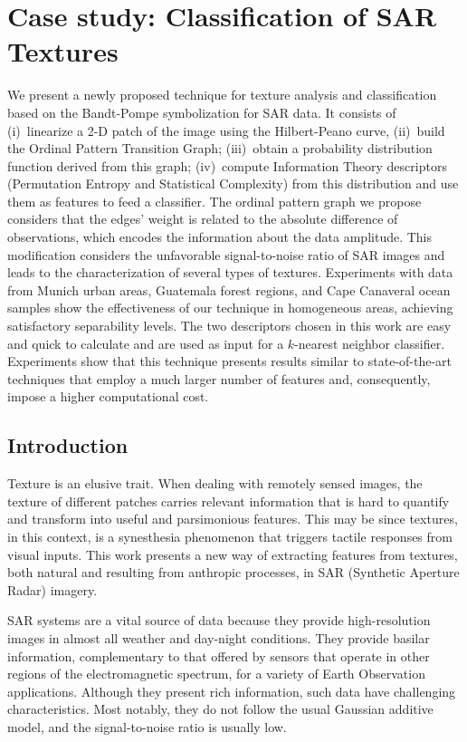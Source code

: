 \chapter{Case study: Classification of SAR Textures}\label{chapter:SARclassification}

We present a newly proposed technique for texture analysis and classification based on the Bandt-Pompe symbolization for SAR data.
It consists of
(i)~linearize a \mbox{2-D} patch of the image using the Hilbert-Peano curve,
(ii)~build the Ordinal Pattern Transition Graph;
(iii)~obtain a probability distribution function derived from this graph;
(iv)~compute Information Theory descriptors (Permutation Entropy and Statistical Complexity) from this distribution and use them as features to feed a classifier.
The ordinal pattern graph we propose considers that the edges' weight is related to the absolute difference of observations, which encodes the information about the data amplitude. 
This modification considers the unfavorable signal-to-noise ratio of SAR images and leads to the characterization of several types of textures.
Experiments with data from Munich urban areas, Guatemala forest regions, and Cape Canaveral ocean samples show the effectiveness of our technique in homogeneous areas, achieving satisfactory separability levels.
The two descriptors chosen in this work are easy and quick to calculate and are used as input for a $k$-nearest neighbor classifier.
Experiments show that this technique presents results similar to state-of-the-art techniques that employ a much larger number of features and, consequently, impose a higher computational cost.

\section{Introduction}\label{SAR:Intro}

Texture is an elusive trait.
When dealing with remotely sensed images, the texture of different patches carries relevant information that is hard to quantify and transform into useful and parsimonious features.
This may be since textures, in this context, is a synesthesia phenomenon that triggers tactile responses from visual inputs.
This work presents a new way of extracting features from textures, both natural and resulting from anthropic processes, in SAR (Synthetic Aperture Radar) imagery.

SAR systems are a vital source of data because they provide high-resolution images in almost all weather and day-night conditions.
They provide basilar information, complementary to that offered by sensors that operate in other regions of the electromagnetic spectrum, for a variety of Earth Observation applications.	
Although they present rich information, such data have challenging characteristics.
Most notably, they do not follow the usual Gaussian additive model, and the signal-to-noise ratio is usually low.

